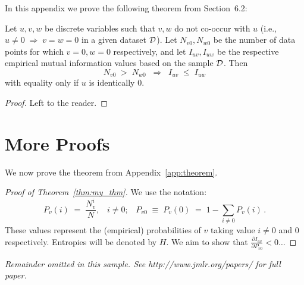 \documentclass[twoside,11pt]{article}
\newcommand{\dataset}{{\cal D}}
\newcommand{\fracpartial}[2]{\frac{\partial #1}{\partial  #2}}
\begin{document}


In this appendix we prove the following theorem from
Section~6.2:

\begin{theorem}[discrete]\label{thm:my_thm}
	Let $u,v,w$ be discrete variables such that $v, w$ do
	not co-occur with $u$ (i.e., $u\neq0\;\Rightarrow \;v=w=0$ in a given
	dataset $\dataset$). Let $N_{v0},N_{w0}$ be the number of data points for
	which $v=0, w=0$ respectively, and let $I_{uv},I_{uw}$ be the
	respective empirical mutual information values based on the sample
	$\dataset$. Then
	\[
	N_{v0} \;>\; N_{w0}\;\;\Rightarrow\;\;I_{uv} \;\leq\;I_{uw}
	\]
	with equality only if $u$ is identically 0.
\end{theorem}

\begin{proof}
	Left to the reader.
\end{proof}

\section{More Proofs}
We now prove the theorem from Appendix~\ref{app:theorem}.
\begin{proof}[Proof of Theorem~\ref{thm:my_thm}]
	We use the notation:
	\[
	P_v(i) \;=\;\frac{N_v^i}{N},\;\;\;i \neq 0;\;\;\;
	P_{v0}\;\equiv\;P_v(0)\; = \;1 - \sum_{i\neq 0}P_v(i)\,.
	\]
	These values represent the (empirical) probabilities of $v$
	taking value $i\neq 0$ and 0 respectively.  Entropies will be denoted
	by $H$. We aim to show that $\fracpartial{I_{uv}}{P_{v0}} < 0 \ldots$
\end{proof}

{\noindent \em Remainder omitted in this sample. See http://www.jmlr.org/papers/ for full paper.}


\vskip 0.2in

\end{document}
